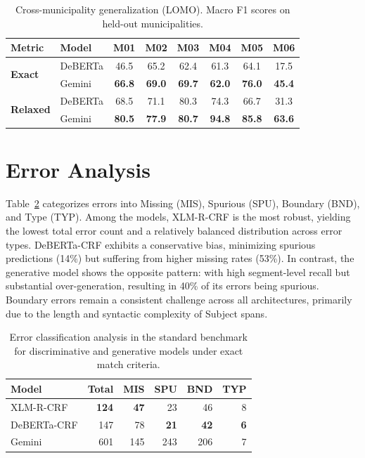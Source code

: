 \documentclass[11pt]{article}
\begin{document}
\begin{table}[ht!]
\centering
\small
\setlength{\tabcolsep}{3pt} %
\caption{Cross-municipality generalization (LOMO). Macro F1 scores on held-out municipalities.}
\label{tab:cross_muni}
\begin{tabular}{llcccccc}
\toprule
\textbf{Metric} & \textbf{Model} & \textbf{M01} & \textbf{M02} & \textbf{M03} & \textbf{M04} & \textbf{M05} & \textbf{M06} \\
\midrule
\multirow{2}{*}{\textbf{Exact}} & DeBERTa & 46.5 & 65.2 & 62.4 & 61.3 & 64.1 & 17.5 \\
& Gemini  & \textbf{66.8} & \textbf{69.0} & \textbf{69.7} & \textbf{62.0} & \textbf{76.0} & \textbf{45.4} \\
\midrule
\multirow{2}{*}{\textbf{Relaxed}} & DeBERTa & 68.5 & 71.1 & 80.3 & 74.3 & 66.7 & 31.3 \\
& Gemini  & \textbf{80.5} & \textbf{77.9} & \textbf{80.7} & \textbf{94.8} & \textbf{85.8} & \textbf{63.6} \\
\bottomrule
\end{tabular}
\end{table}


\section{Error Analysis}
\label{sec:error_analysis}

Table~\ref{tab:error_classification} categorizes errors into Missing (MIS), Spurious (SPU), Boundary (BND), and Type (TYP). Among the models, XLM-R-CRF is the most robust, yielding the lowest total error count and a relatively balanced distribution across error types. DeBERTa-CRF exhibits a conservative bias, minimizing spurious predictions (14\%) but suffering from higher missing rates (53\%). In contrast, the generative model shows the opposite pattern: with high segment-level recall but substantial over-generation, resulting in 40\% of its errors being spurious. Boundary errors remain a consistent challenge across all architectures, primarily due to the length and syntactic complexity of Subject spans.

\begin{table}[ht!]
\centering
\footnotesize
\caption{Error classification analysis in the standard benchmark for discriminative and generative models under exact match criteria.}
\label{tab:error_classification}
\begin{tabular}{@{}lrrrrr@{}}
\toprule
\textbf{Model} & \textbf{Total} & \textbf{MIS} & \textbf{SPU} & \textbf{BND} & \textbf{TYP} \\
\midrule
XLM-R-CRF   & \textbf{124} & \textbf{47} & 23 & 46 & 8 \\
DeBERTa-CRF & 147 & 78 & \textbf{21} & \textbf{42} & \textbf{6} \\
Gemini      & 601 & 145 & 243 & 206 & 7 \\
\bottomrule
\end{tabular}
\end{table}
\end{document}
